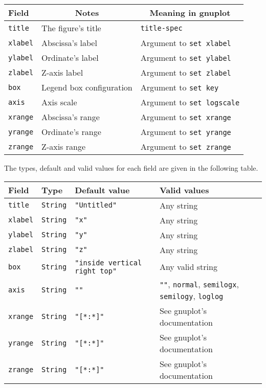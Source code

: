 \documentclass[11pt]{article}
\newcommand{\cmd}[1]{\texttt{#1}}
\begin{document}
{\small
\begin{center}
\begin{tabular}{lll}
	\toprule
	\textbf{Field} & \multicolumn{1}{c}{\textbf{Notes}} &
	\multicolumn{1}{c}{\textbf{Meaning in gnuplot}} \\
	\midrule
	\cmd{title} & The figure's title & \cmd{title-spec} \\
	\cmd{xlabel} & Abscissa's label & Argument to \cmd{set xlabel} \\
	\cmd{ylabel} & Ordinate's label & Argument to \cmd{set ylabel} \\
	\cmd{zlabel} & Z-axis label & Argument to \cmd{set zlabel} \\
	\cmd{box} & Legend box configuration & Argument to \cmd{set key} \\
	\cmd{axis} & Axis scale & Argument to \cmd{set logscale} \\
	\cmd{xrange} & Abscissa's range & Argument to \cmd{set xrange} \\
	\cmd{yrange} & Ordinate's range & Argument to \cmd{set yrange} \\
	\cmd{zrange} & Z-axis range & Argument to \cmd{set zrange} \\
	\bottomrule
\end{tabular}
\end{center}}

The types, default and valid values for each field are given in the following
table.

{\small
\begin{center}
	\begin{tabular}{lp{1.5cm}p{2cm}p{7.5cm}}
	\toprule
	\textbf{Field} & \textbf{Type} & \textbf{Default value} & \textbf{Valid values} \\
	\midrule
	\cmd{title} & \cmd{String} & \cmd{"Untitled"} & Any string \\
	\cmd{xlabel} & \cmd{String} & \cmd{"x"} & Any string \\
	\cmd{ylabel} & \cmd{String} & \cmd{"y"} & Any string \\
	\cmd{zlabel} & \cmd{String} & \cmd{"z"} & Any string \\
	\cmd{box} & \cmd{String} & \cmd{"inside vertical right top"} & Any valid
	string \\
	\cmd{axis} & \cmd{String} & \cmd{""} & \cmd{""}, \cmd{normal},
	\cmd{semilogx}, \cmd{semilogy}, \cmd{loglog}  \\
	\cmd{xrange} & \cmd{String} & \cmd{"[*:*]"} & See gnuplot's documentation \\
	\cmd{yrange} & \cmd{String} & \cmd{"[*:*]"} & See gnuplot's documentation \\
	\cmd{zrange} & \cmd{String} & \cmd{"[*:*]"} & See gnuplot's documentation \\
	\bottomrule
\end{tabular}
\end{center}}
\end{document}
